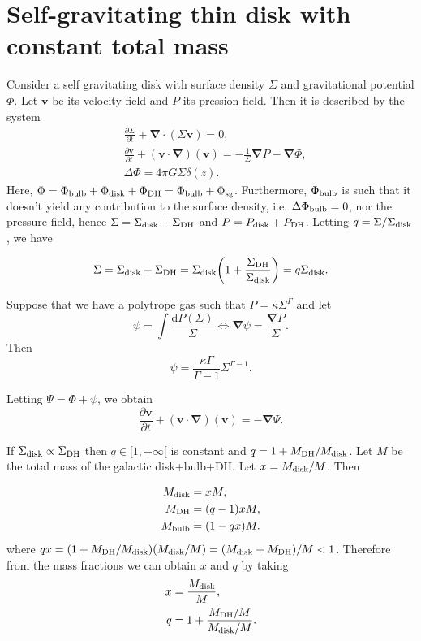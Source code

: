 \documentclass[11pt]{article}
\newcommand{\bv}{\boldsymbol{v}}
\newcommand{\bnab}{\boldsymbol{\nabla}}
\newcommand{\rd}{\mathrm{d}}
\newcommand{\Sigmad}{\Sigma_{\rm{disk}}}
\newcommand{\Sigmadh}{\Sigma_{\rm{DH}}}
\newcommand{\Phib}{\Phi_{\rm{bulb}}}
\newcommand{\Phid}{\Phi_{\rm{disk}}}
\newcommand{\Phidh}{\Phi_{\rm{DH}}}
\newcommand{\Phisg}{\Phi_{\rm{sg}}}
\newcommand{\Mb}{M_{\rm{bulb}}}
\newcommand{\Md}{M_{\rm{disk}}}
\newcommand{\Mdh}{M_{\rm{DH}}}
\begin{document}
\section{Self-gravitating thin disk with constant total mass}
\label{sec:sg_disk_cst_mass}

Consider a self gravitating disk with surface density $\Sigma$ and gravitational potential $\Phi$. Let $\bv$ be its velocity field and $P$ its pression field. Then it is described by the system
\begin{align}
&\frac{\partial \Sigma}{\partial t} + \bnab \cdot (\Sigma \bv) = 0 ,\\
&\frac{\partial \bv}{\partial t} + (\bv \cdot \bnab)(\bv) = -\frac{1}{\Sigma} \bnab P - \bnab \Phi ,\\
& \Delta \Phi = 4\pi G \Sigma \delta (z).
\end{align}
Here, $\Phi =\Phib+  \Phid +  \Phidh=\Phib +  \Phisg$. Furthermore, $\Phib$  is such that it doesn't yield any contribution to the surface density, i.e. $\Delta \Phib=0$, nor the pressure field, hence $\Sigma =\Sigmad+\Sigmadh$ and $P =P_{\rm{disk}}+P_{\rm{DH}}$. Letting $q=\Sigma/\Sigmad$, we have

\begin{equation}
\Sigma=\Sigmad+\Sigma_{\rm{DH}}=\Sigmad\bigg(1+\frac{\Sigmadh}{\Sigmad}\bigg) =q \Sigmad.
\end{equation}

Suppose that we have a polytrope gas such that $P=\kappa \Sigma^{\Gamma}$ and let
\begin{equation}
\psi = \int \frac{\rd P(\Sigma)}{\Sigma} \Leftrightarrow \bnab \psi = \frac{\bnab P}{\Sigma}.
\end{equation}
 Then
 \begin{equation}
\psi = \frac{\kappa \Gamma}{\Gamma-1} \Sigma^{\Gamma-1}.
\end{equation}
 
 Letting $\Psi = \Phi + \psi$, we obtain
\begin{equation}
\frac{\partial \bv}{\partial t} + (\bv \cdot \bnab)(\bv) = - \bnab \Psi.
\end{equation}

If $\Sigma_{\rm{disk}}\propto\Sigma_{\rm{DH}}$ then $q\in [1,+\infty[$ is constant and $q=1+\Mdh/\Md$. Let  $M$ be the total mass of the galactic disk+bulb+DH. Let $x=\Md/M$.  Then

\begin{align*}
\Md &= x M,\\
\Mdh &= (q-1) x M,\\
\Mb &= (1 - qx)M  .
\end{align*}
where $qx=(1+\Mdh/\Md)(\Md/M)=(\Md+\Mdh)/M < 1$. Therefore from the mass fractions we can obtain $x$ and $q$ by taking
\begin{align*}
x&=  \frac{\Md }{M},\\
q &= 1+\frac{\Mdh/M}{\Md/M}  .
\end{align*}
\end{document}
